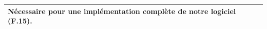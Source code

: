 \documentclass[a4paper,12pt]{article}
\begin{document}
\begin{tabularx}{\textwidth}{|X|}
    Nécessaire pour une implémentation complète de notre logiciel (F.15).                                                                                                                                                                                                                                                                                                                                                                                                                                                                                                                                                       \\
    \hline
\end{tabularx}

\vspace{1cm}

\noindent
\setlength{\arrayrulewidth}{1.5pt}
\renewcommand{\arraystretch}{1.5}
\end{document}
